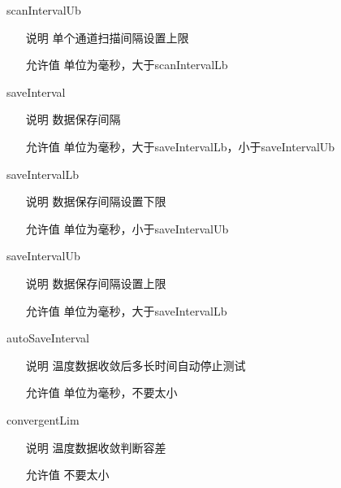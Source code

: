 \begin{definition}{scanIntervalUb}{}
    \begin{itemize}
        \item[说明] 单个通道扫描间隔设置上限
        \item[允许值] 单位为毫秒，大于scanIntervalLb
    \end{itemize}
\end{definition}

\begin{definition}{saveInterval}{}
    \begin{itemize}
        \item[说明] 数据保存间隔
        \item[允许值] 单位为毫秒，大于saveIntervalLb，小于saveIntervalUb
    \end{itemize}
\end{definition}

\begin{definition}{saveIntervalLb}{}
    \begin{itemize}
        \item[说明] 数据保存间隔设置下限
        \item[允许值] 单位为毫秒，小于saveIntervalUb
    \end{itemize}
\end{definition}

\begin{definition}{saveIntervalUb}{}
    \begin{itemize}
        \item[说明] 数据保存间隔设置上限
        \item[允许值] 单位为毫秒，大于saveIntervalLb
    \end{itemize}
\end{definition}

\begin{definition}{autoSaveInterval}{}
    \begin{itemize}
        \item[说明] 温度数据收敛后多长时间自动停止测试
        \item[允许值] 单位为毫秒，不要太小
    \end{itemize}
\end{definition}

\begin{definition}{convergentLim}{}
    \begin{itemize}
        \item[说明] 温度数据收敛判断容差
        \item[允许值] 不要太小
    \end{itemize}
\end{definition}

